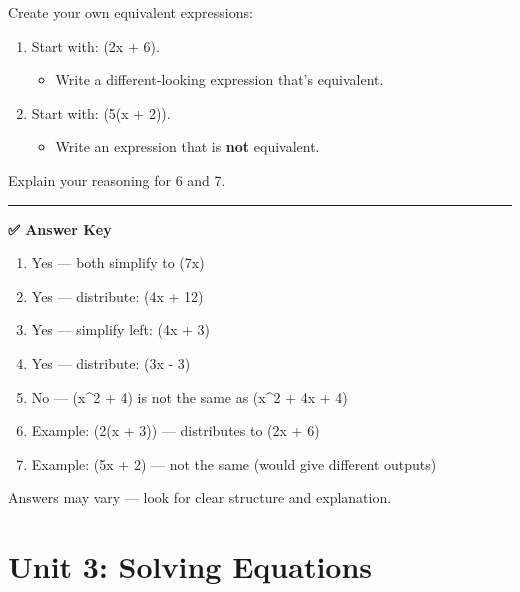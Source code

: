 \documentclass[
  letterpaper,
  DIV=11,
  numbers=noendperiod]{scrreprt}
\providecommand{\tightlist}{%
  \setlength{\itemsep}{0pt}\setlength{\parskip}{0pt}}
\begin{document}
Create your own equivalent expressions:

\begin{enumerate}
\def\labelenumi{\arabic{enumi}.}
\setcounter{enumi}{5}
\tightlist
\item
  Start with: (2x + 6).

  \begin{itemize}
  \tightlist
  \item
    Write a different-looking expression that's equivalent.
  \end{itemize}
\item
  Start with: (5(x + 2)).

  \begin{itemize}
  \tightlist
  \item
    Write an expression that is \textbf{not} equivalent.
  \end{itemize}
\end{enumerate}

Explain your reasoning for 6 and 7.

\begin{center}\rule{0.5\linewidth}{0.5pt}\end{center}

\textbf{✅ Answer Key}

\begin{enumerate}
\def\labelenumi{\arabic{enumi}.}
\item
  Yes --- both simplify to (7x)\\
\item
  Yes --- distribute: (4x + 12)\\
\item
  Yes --- simplify left: (4x + 3)\\
\item
  Yes --- distribute: (3x - 3)\\
\item
  No --- (x\^{}2 + 4) is not the same as (x\^{}2 + 4x + 4)
\item
  Example: (2(x + 3)) --- distributes to (2x + 6)\\
\item
  Example: (5x + 2) --- not the same (would give different outputs)
\end{enumerate}

Answers may vary --- look for clear structure and explanation.

\part{Unit 3: Solving Equations}
\end{document}
